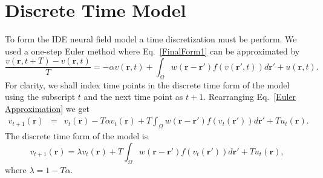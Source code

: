 \documentclass[onecolumn,draftcls]{IEEEtran}
\begin{document}
\section{Discrete Time Model}\label{Time Discretization}
To form the IDE neural field model a time discretization must be perform. We used a one-step Euler method where Eq.~\ref{FinalForm1} can be approximated by
\begin{equation}\label{Euler Approximation}	
\frac{v\left( \mathbf{r},t+T \right) - v\left( \mathbf{r},t\right)}{T} =   -\alpha v\left( \mathbf{r},t \right) + \int_\Omega  {w\left( \mathbf{r}-\mathbf{r}' \right)f\left( {v\left( \mathbf{r}',t \right)} \right)d\mathbf{r}'} + u\left(\mathbf{r},t\right).
\end{equation}
For clarity, we shall index time points in the discrete time form of the model using the subscript $t$ and the next time point as $t+1$. Rearranging Eq.~\ref{Euler Approximation} we get
\begin{eqnarray}\label{Euler Approximation}	
v_{t+1}\left( \mathbf{r}\right) &=& v_t\left( \mathbf{r}\right) -T \alpha v_t\left( \mathbf{r}\right) + T \int_\Omega  {w\left( \mathbf{r}-\mathbf{r}' \right)f\left( {v_t\left( \mathbf{r}'\right)} \right)d\mathbf{r}'} + T u_t\left(\mathbf{r}\right).
\end{eqnarray}
The discrete time form of the model is
\begin{equation}\label{Discrete Time Model1}
	v_{t+1}\left(\mathbf{r}\right) = \lambda v_t\left(\mathbf{r}\right) + T \int_\Omega { w\left(\mathbf{r}-\mathbf{r}'\right) f\left(v_t\left(\mathbf{r}'\right)\right) d\mathbf{r}'} + T u_t\left(\mathbf{r}\right),
\end{equation}
where $\lambda = 1 - T \alpha$.
\end{document}
